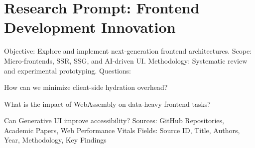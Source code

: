 \section*{Research Prompt: Frontend Development Innovation}
Objective: Explore and implement next-generation frontend architectures.
Scope: Micro-frontends, SSR, SSG, and AI-driven UI.
Methodology: Systematic review and experimental prototyping.
Questions:
\item How can we minimize client-side hydration overhead? \\
\item What is the impact of WebAssembly on data-heavy frontend tasks? \\
\item Can Generative UI improve accessibility?
Sources: GitHub Repositories, Academic Papers, Web Performance Vitals
Fields: Source ID, Title, Authors, Year, Methodology, Key Findings
